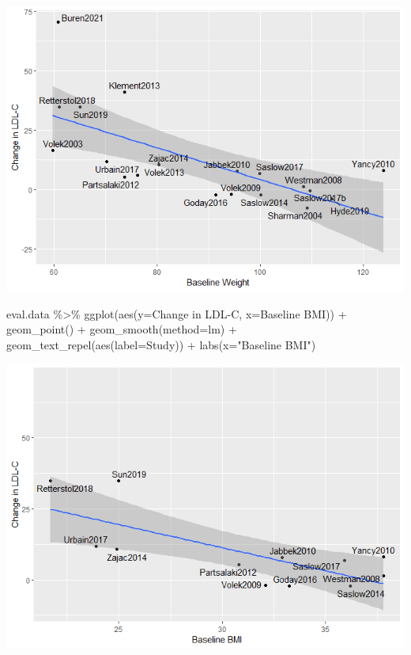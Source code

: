 \documentclass[
]{article}
\newenvironment{Shaded}{\begin{snugshade}}{\end{snugshade}}
\newcommand{\AttributeTok}[1]{\textcolor[rgb]{0.77,0.63,0.00}{#1}}
\newcommand{\FunctionTok}[1]{\textcolor[rgb]{0.00,0.00,0.00}{#1}}
\newcommand{\NormalTok}[1]{#1}
\newcommand{\SpecialCharTok}[1]{\textcolor[rgb]{0.00,0.00,0.00}{#1}}
\newcommand{\StringTok}[1]{\textcolor[rgb]{0.31,0.60,0.02}{#1}}
\begin{document}
\includegraphics{figures/ldl-change-vs-weight-3.png}

\begin{Shaded}
\begin{Highlighting}[]
\NormalTok{eval.data }\SpecialCharTok{\%\textgreater{}\%}
  \FunctionTok{ggplot}\NormalTok{(}\FunctionTok{aes}\NormalTok{(}\AttributeTok{y=}\StringTok{\textasciigrave{}}\AttributeTok{Change in LDL{-}C}\StringTok{\textasciigrave{}}\NormalTok{,}
             \AttributeTok{x=}\StringTok{\textasciigrave{}}\AttributeTok{Baseline BMI}\StringTok{\textasciigrave{}}\NormalTok{)) }\SpecialCharTok{+}
  \FunctionTok{geom\_point}\NormalTok{() }\SpecialCharTok{+}
  \FunctionTok{geom\_smooth}\NormalTok{(}\AttributeTok{method=}\StringTok{\textquotesingle{}lm\textquotesingle{}}\NormalTok{) }\SpecialCharTok{+}
  \FunctionTok{geom\_text\_repel}\NormalTok{(}\FunctionTok{aes}\NormalTok{(}\AttributeTok{label=}\NormalTok{Study)) }\SpecialCharTok{+}
  \FunctionTok{labs}\NormalTok{(}\AttributeTok{x=}\StringTok{"Baseline BMI"}\NormalTok{)}
\end{Highlighting}
\end{Shaded}

\includegraphics{figures/ldl-change-vs-weight-4.png}
\end{document}
